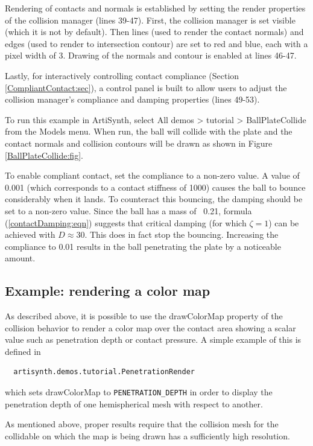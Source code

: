Rendering of contacts and normals is established by setting the render
properties of the collision manager (lines 39-47). First, the
collision manager is set visible (which it is not by default).  Then
lines (used to render the contact normals) and edges (used to render
to intersection contour) are set to red and blue, each with a pixel
width of 3.  Drawing of the normals and contour is enabled at lines
46-47.

Lastly, for interactively controlling contact compliance
(Section \ref{CompliantContact:sec}), a control panel is built to
allow users to adjust the collision manager's {\sf compliance} and
{\sf damping} properties (lines 49-53).

To run this example in ArtiSynth, select {\sf All demos > tutorial >
BallPlateCollide} from the {\sf Models} menu. When run, the ball
will collide with the plate and the contact normals and collision 
contours will be drawn as shown in Figure \ref{BallPlateCollide:fig}.

To enable compliant contact, set the {\sf compliance} to a
non-zero value. A value of 0.001 (which corresponds to a contact
stiffness of 1000) causes the ball to bounce considerably when it
lands. To counteract this bouncing, the {\sf damping} should be set to
a non-zero value. Since the ball has a mass of ~0.21, formula
(\ref{contactDamping:eqn}) suggests that critical damping (for which
$\zeta=1$) can be achieved with $D \approx 30$. This does in fact stop
the bouncing. Increasing the compliance to 0.01 results in the ball
penetrating the plate by a noticeable amount.

\subsection{Example: rendering a color map}
\label{renderingDepth:sec}

As described above, it is possible to use the {\sf drawColorMap}
property of the collision behavior to render a color map over the
contact area showing a scalar value such as penetration depth or
contact pressure. A simple example of this is defined in
%
\begin{verbatim}
  artisynth.demos.tutorial.PenetrationRender
\end{verbatim}
%
which sets {\sf drawColorMap} to {\tt PENETRATION\_DEPTH} in order to
display the penetration depth of one hemispherical mesh with respect
to another. 

\begin{sideblock}
As mentioned above, proper results require that the collision mesh for
the collidable on which the map is being drawn has a sufficiently high
resolution.
\end{sideblock}

